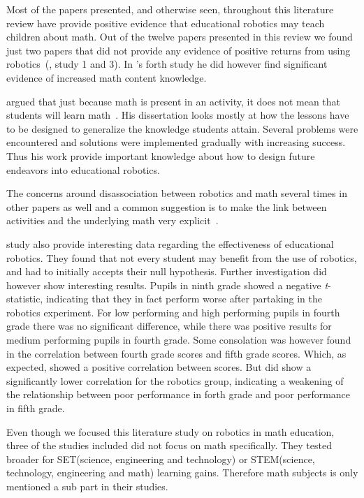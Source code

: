 Most of the papers presented, and otherwise seen, throughout this literature review have provide positive evidence that educational robotics
may teach children about math. 
Out of the twelve papers presented in this review we found just two papers that did not provide any evidence of positive returns from using robotics~(, study 1 and 3). 
In \citeauthor{silk2011resources}'s forth study he did however find significant evidence of increased math content knowledge. 

\bigskip\noindent
\citeauthor{silk2011resources} argued that just because math is present in an activity, it does not mean that students will learn math~\cite{silk2011resources}.
His dissertation looks mostly at how the lessons have to be designed to generalize the knowledge students attain. Several problems were encountered and solutions were implemented gradually with increasing success. 
Thus his work provide important knowledge about how to design future endeavors into educational robotics. 

\bigskip\noindent
The concerns around disassociation between robotics and math several times in other papers as well and a common suggestion is to make the link between activities and the underlying math very explicit~\cite{nugent2008effect}. 

\bigskip\noindent
\citeauthor*{lindh2007does} study also provide interesting data regarding the effectiveness of educational robotics. 
They found that not every student may benefit from the use of robotics, and had to initially accepts their null hypothesis. 
Further investigation did however show interesting results. 
Pupils in ninth grade showed a negative \textit{t}-statistic, indicating that they in fact perform worse after partaking in the robotics experiment. 
For low performing and high performing pupils in fourth grade there was no significant difference, while there was positive results for medium performing pupils in fourth grade. 
Some consolation was however found in the correlation between fourth grade scores and fifth grade scores. 
Which, as expected, showed a positive correlation between scores. 
But did show a significantly lower correlation for the robotics group, indicating a weakening of the relationship between poor performance in forth grade and poor performance in fifth grade. 

\bigskip\noindent
Even though we focused this literature study on robotics in math education, three of the studies included did not focus on math specifically\cite{barker2007robotics, nugent2008effect, nugent2009use}. They tested broader for SET(science, engineering and technology) or STEM(science, technology, engineering and math) learning gains. Therefore math subjects is only mentioned a sub part in their studies.


